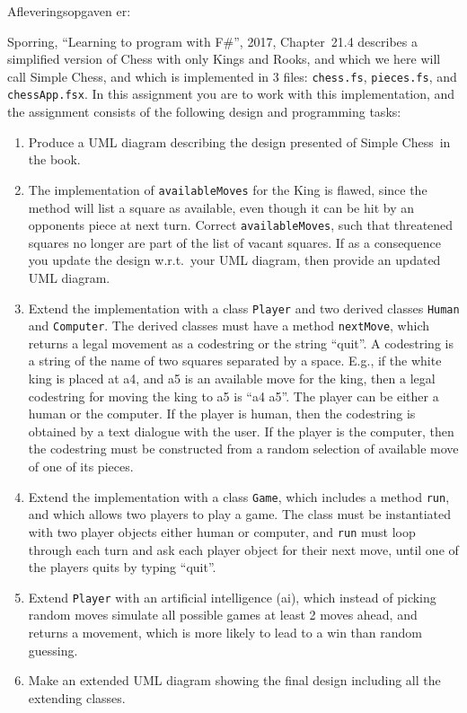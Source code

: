 \documentclass[a4paper,12pt]{article}
\newcommand{\chess}{Simple Chess}
\begin{document}
Afleveringsopgaven er:

Sporring, ``Learning to program with F\#'', 2017, Chapter~21.4 describes a simplified version of Chess with only Kings and Rooks, and which we here will call \chess, and which is implemented in 3 files: \lstinline{chess.fs}, \lstinline{pieces.fs}, and \lstinline{chessApp.fsx}. In this assignment you are to work with this implementation, and the assignment consists of the following design and programming tasks:
\begin{enumerate}[label=11g.\arabic*,start=0]
\item Produce a UML diagram describing the design presented of \chess\ in the book.
\item The implementation of \lstinline{availableMoves} for the King is flawed, since the method will list a square as available, even though it can be hit by an opponents piece at next turn. Correct \lstinline{availableMoves}, such that threatened squares no longer are part of the list of vacant squares. If as a consequence you update the design w.r.t.\ your UML diagram, then provide an updated UML diagram.
\item Extend the implementation with a class \lstinline{Player} and two derived classes \lstinline{Human} and \lstinline{Computer}. The derived classes must have a method \lstinline{nextMove}, which returns a legal movement as a codestring or the string ``quit''.  A codestring is a string of the name of two squares separated by a space. E.g., if the white king is placed at a4, and a5 is an available move for the king, then a legal codestring for moving the king to a5 is ``a4 a5''. The player can be either a human or the computer. If the player is human, then the codestring is obtained by a text dialogue with the user. If the player is the computer, then the codestring must be constructed from a random selection of available move of one of its pieces.
\item Extend the implementation with a class \lstinline{Game}, which includes a method \lstinline{run}, and which allows two players to play a game. The class must be instantiated with two player objects either human or computer, and \lstinline{run} must loop through each turn and ask each player object for their next move, until one of the players quits by typing ``quit''.
\item Extend \lstinline{Player} with an artificial intelligence (ai), which instead of picking random moves simulate all possible games at least 2 moves ahead, and returns a movement, which is more likely to lead to a win than random guessing.
\item Make an extended UML diagram showing the final design including all the extending classes.
\end{enumerate}
\end{document}
